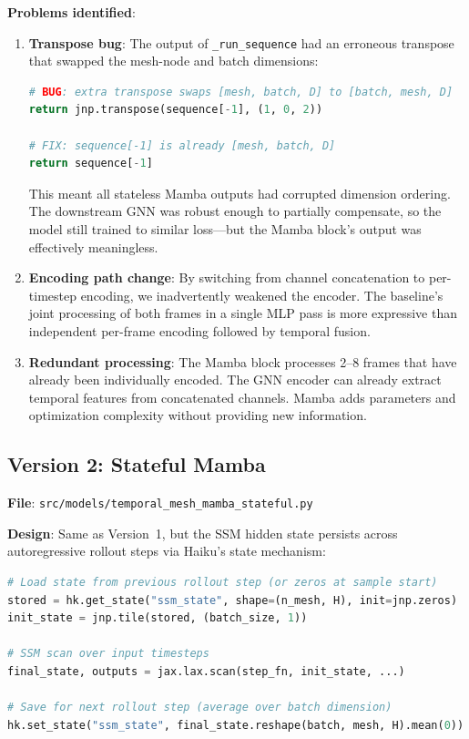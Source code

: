 \documentclass[11pt,a4paper]{article}
\begin{document}
\textbf{Problems identified}:
\begin{enumerate}
    \item \textbf{Transpose bug}: The output of \texttt{\_run\_sequence} had an erroneous transpose that swapped the mesh-node and batch dimensions:
    \begin{lstlisting}[language=Python]
# BUG: extra transpose swaps [mesh, batch, D] to [batch, mesh, D]
return jnp.transpose(sequence[-1], (1, 0, 2))

# FIX: sequence[-1] is already [mesh, batch, D]
return sequence[-1]
    \end{lstlisting}
    This meant all stateless Mamba outputs had corrupted dimension ordering. The downstream GNN was robust enough to partially compensate, so the model still trained to similar loss---but the Mamba block's output was effectively meaningless.

    \item \textbf{Encoding path change}: By switching from channel concatenation to per-timestep encoding, we inadvertently weakened the encoder. The baseline's joint processing of both frames in a single MLP pass is more expressive than independent per-frame encoding followed by temporal fusion.

    \item \textbf{Redundant processing}: The Mamba block processes 2--8 frames that have already been individually encoded. The GNN encoder can already extract temporal features from concatenated channels. Mamba adds parameters and optimization complexity without providing new information.
\end{enumerate}

\subsection{Version 2: Stateful Mamba}

\textbf{File}: \texttt{src/models/temporal\_mesh\_mamba\_stateful.py}

\textbf{Design}: Same as Version~1, but the SSM hidden state persists across autoregressive rollout steps via Haiku's state mechanism:

\begin{lstlisting}[language=Python]
# Load state from previous rollout step (or zeros at sample start)
stored = hk.get_state("ssm_state", shape=(n_mesh, H), init=jnp.zeros)
init_state = jnp.tile(stored, (batch_size, 1))

# SSM scan over input timesteps
final_state, outputs = jax.lax.scan(step_fn, init_state, ...)

# Save for next rollout step (average over batch dimension)
hk.set_state("ssm_state", final_state.reshape(batch, mesh, H).mean(0))
\end{lstlisting}
\end{document}

